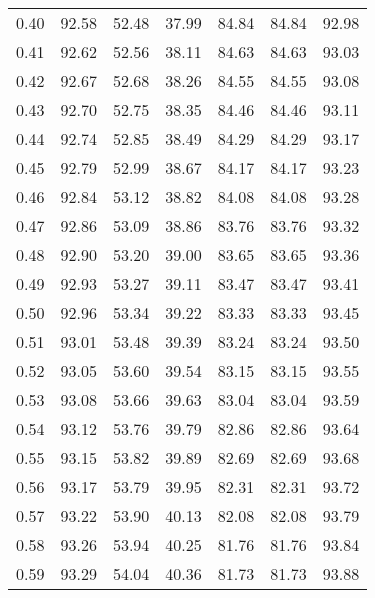 \begin{tabular}{|c|c|c|c|c|c|c|}
      0.40 &     92.58 &     52.48 &      37.99 &   84.84 &      84.84 &         92.98 \\
      0.41 &     92.62 &     52.56 &      38.11 &   84.63 &      84.63 &         93.03 \\
      0.42 &     92.67 &     52.68 &      38.26 &   84.55 &      84.55 &         93.08 \\
      0.43 &     92.70 &     52.75 &      38.35 &   84.46 &      84.46 &         93.11 \\
      0.44 &     92.74 &     52.85 &      38.49 &   84.29 &      84.29 &         93.17 \\
      0.45 &     92.79 &     52.99 &      38.67 &   84.17 &      84.17 &         93.23 \\
      0.46 &     92.84 &     53.12 &      38.82 &   84.08 &      84.08 &         93.28 \\
      0.47 &     92.86 &     53.09 &      38.86 &   83.76 &      83.76 &         93.32 \\
      0.48 &     92.90 &     53.20 &      39.00 &   83.65 &      83.65 &         93.36 \\
      0.49 &     92.93 &     53.27 &      39.11 &   83.47 &      83.47 &         93.41 \\
      0.50 &     92.96 &     53.34 &      39.22 &   83.33 &      83.33 &         93.45 \\
      0.51 &     93.01 &     53.48 &      39.39 &   83.24 &      83.24 &         93.50 \\
      0.52 &     93.05 &     53.60 &      39.54 &   83.15 &      83.15 &         93.55 \\
      0.53 &     93.08 &     53.66 &      39.63 &   83.04 &      83.04 &         93.59 \\
      0.54 &     93.12 &     53.76 &      39.79 &   82.86 &      82.86 &         93.64 \\
      0.55 &     93.15 &     53.82 &      39.89 &   82.69 &      82.69 &         93.68 \\
      0.56 &     93.17 &     53.79 &      39.95 &   82.31 &      82.31 &         93.72 \\
      0.57 &     93.22 &     53.90 &      40.13 &   82.08 &      82.08 &         93.79 \\
      0.58 &     93.26 &     53.94 &      40.25 &   81.76 &      81.76 &         93.84 \\
      0.59 &     93.29 &     54.04 &      40.36 &   81.73 &      81.73 &         93.88 \\

\end{tabular}
